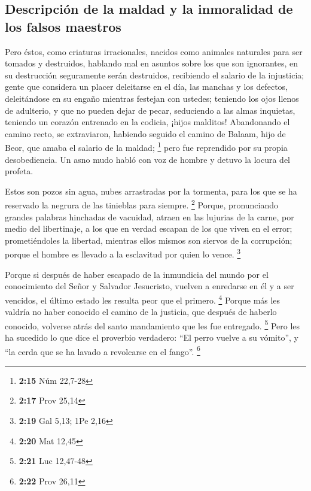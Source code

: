 \hypertarget{descripciuxf3n-de-la-maldad-y-la-inmoralidad-de-los-falsos-maestros}{%
\subsection{Descripción de la maldad y la inmoralidad de los falsos
maestros}\label{descripciuxf3n-de-la-maldad-y-la-inmoralidad-de-los-falsos-maestros}}

 Pero éstos, como criaturas irracionales, nacidos como
animales naturales para ser tomados y destruidos, hablando mal en
asuntos sobre los que son ignorantes, en su destrucción seguramente
serán destruidos,  recibiendo el salario de la
injusticia; gente que considera un placer deleitarse en el día, las
manchas y los defectos, deleitándose en su engaño mientras festejan con
ustedes;  teniendo los ojos llenos de adulterio, y que no
pueden dejar de pecar, seduciendo a las almas inquietas, teniendo un
corazón entrenado en la codicia, ¡hijos malditos! 
Abandonando el camino recto, se extraviaron, habiendo seguido el camino
de Balaam, hijo de Beor, que amaba el salario de la maldad; \footnote{\textbf{2:15}
  Núm 22,7-28}  pero fue reprendido por su propia
desobediencia. Un asno mudo habló con voz de hombre y detuvo la locura
del profeta.

 Estos son pozos sin agua, nubes arrastradas por la
tormenta, para los que se ha reservado la negrura de las tinieblas para
siempre. \footnote{\textbf{2:17} Prov 25,14}  Porque,
pronunciando grandes palabras hinchadas de vacuidad, atraen en las
lujurias de la carne, por medio del libertinaje, a los que en verdad
escapan de los que viven en el error;  prometiéndoles la
libertad, mientras ellos mismos son siervos de la corrupción; porque el
hombre es llevado a la esclavitud por quien lo vence. \footnote{\textbf{2:19}
  Gal 5,13; 1Pe 2,16}

 Porque si después de haber escapado de la inmundicia del
mundo por el conocimiento del Señor y Salvador Jesucristo, vuelven a
enredarse en él y a ser vencidos, el último estado les resulta peor que
el primero. \footnote{\textbf{2:20} Mat 12,45}  Porque
más les valdría no haber conocido el camino de la justicia, que después
de haberlo conocido, volverse atrás del santo mandamiento que les fue
entregado. \footnote{\textbf{2:21} Luc 12,47-48}  Pero
les ha sucedido lo que dice el proverbio verdadero: ``El perro vuelve a
su vómito'', y ``la cerda que se ha lavado a revolcarse en el fango''.
\footnote{\textbf{2:22} Prov 26,11}

